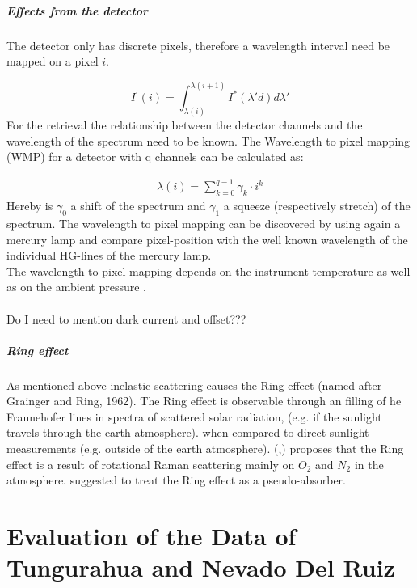 \documentclass  [
  paper    = a4,
  BCOR     = 10mm,
  twoside,
  fontsize = 12pt,
  fleqn,
  toc      = bibnumbered,
  toc      = listofnumbered,
  numbers  = noendperiod,
  headings = normal,
  listof   = leveldown,
  version  = 3.03
]                                       {scrreprt}
\begin{document}
	\subsubsection*{Effects from the detector}
	The detector only has discrete pixels, therefore a wavelength interval need be mapped on a pixel $i$.
	
	\begin{equation}
	I^{'}\left(i\right) = \int_{\lambda(i)}^{\lambda(i+1)}I^{*}\left(\lambda{'}d\right)d\lambda{'}
	\end{equation}
	For the retrieval the relationship between the detector channels and the wavelength of the spectrum need to be known.
	The Wavelength to pixel mapping (WMP) for a detector with q channels can be calculated as:

	\begin{eqnarray}
	\lambda(i) = \sum_{k=0}^{q-1}\gamma_{k}\cdot i^{k}
	\end{eqnarray}
	Hereby is $\gamma_{0}$ a shift of the spectrum and $\gamma_{1}$ a squeeze (respectively stretch) of the spectrum.
	The wavelength to pixel mapping can be discovered by using again a mercury lamp and compare pixel-position with the well known wavelength of the individual HG-lines of the mercury lamp.\\
	The wavelength to pixel mapping depends on the instrument temperature as well as on the ambient pressure \cite{lubcke2014bro}.\\
	\\
	Do I need to mention dark current and offset???
	\subsubsection*{Ring effect}
	As mentioned above inelastic scattering causes the Ring effect (named after Grainger and Ring, 1962).
	The Ring effect is observable through an filling of he Fraunehofer lines in spectra of scattered solar radiation, (e.g. if the sunlight travels through the earth atmosphere). when compared to direct sunlight measurements (e.g. outside of the earth atmosphere).
	(\cite{bussemer1993ring},\cite{solomon1987interpretation}) proposes that the Ring effect is a result of  rotational Raman scattering mainly on
	$O_2$ and $N_2$ in the atmosphere.
	\cite{solomon1987interpretation} suggested to treat the Ring effect as a pseudo-absorber. 


	
	\part{Evaluation of the Data of Tungurahua and Nevado Del Ruiz}
	
\end{document}
